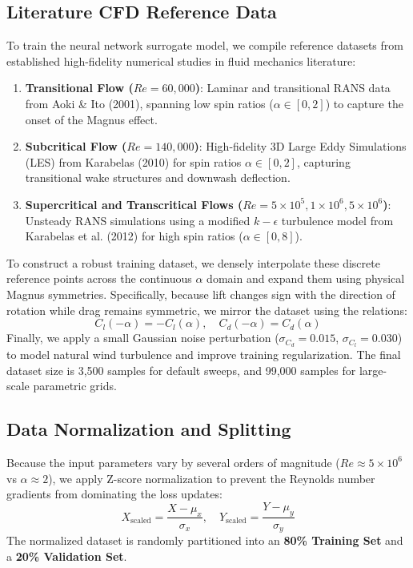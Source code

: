 \documentclass[aip,pof,reprint,onecolumn,amsmath,amssymb,graphicx,longbibliography]{revtex4-2}
\begin{document}
\subsection{\label{subsec:datasets_details}Literature CFD Reference Data}
To train the neural network surrogate model, we compile reference datasets from established high-fidelity numerical studies in fluid mechanics literature:
\begin{enumerate}
    \item \textbf{Transitional Flow ($Re = 60,000$)}: Laminar and transitional RANS data from Aoki \& Ito (2001)\cite{aoki2001}, spanning low spin ratios ($\alpha \in [0, 2]$) to capture the onset of the Magnus effect.
    \item \textbf{Subcritical Flow ($Re = 140,000$)}: High-fidelity 3D Large Eddy Simulations (LES) from Karabelas (2010)\cite{karabelas2010} for spin ratios $\alpha \in [0, 2]$, capturing transitional wake structures and downwash deflection.
    \item \textbf{Supercritical and Transcritical Flows ($Re = 5\times 10^5, 1\times 10^6, 5\times 10^6$)}: Unsteady RANS simulations using a modified $k-\epsilon$ turbulence model from Karabelas et al. (2012)\cite{karabelas2012} for high spin ratios ($\alpha \in [0, 8]$).
\end{enumerate}

To construct a robust training dataset, we densely interpolate these discrete reference points across the continuous $\alpha$ domain and expand them using physical Magnus symmetries. Specifically, because lift changes sign with the direction of rotation while drag remains symmetric, we mirror the dataset using the relations:
\begin{equation}
C_l(-\alpha) = -C_l(\alpha), \quad C_d(-\alpha) = C_d(\alpha)
\end{equation}
Finally, we apply a small Gaussian noise perturbation ($\sigma_{C_d} = 0.015$, $\sigma_{C_l} = 0.030$) to model natural wind turbulence and improve training regularization. The final dataset size is 3,500 samples for default sweeps, and 99,000 samples for large-scale parametric grids.

\subsection{\label{subsec:scaling}Data Normalization and Splitting}
Because the input parameters vary by several orders of magnitude ($Re \approx 5 \times 10^6$ vs $\alpha \approx 2$), we apply Z-score normalization to prevent the Reynolds number gradients from dominating the loss updates:
\begin{equation}
X_{\text{scaled}} = \frac{X - \mu_x}{\sigma_x}, \quad Y_{\text{scaled}} = \frac{Y - \mu_y}{\sigma_y}
\end{equation}
The normalized dataset is randomly partitioned into an \textbf{80\% Training Set} and a \textbf{20\% Validation Set}.
\end{document}
